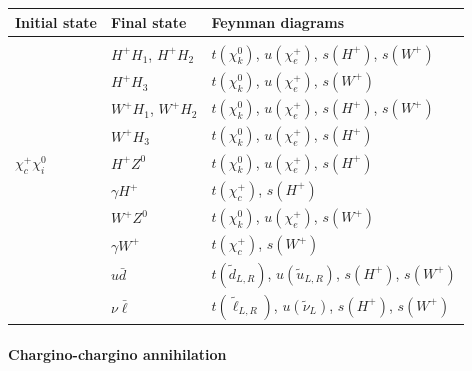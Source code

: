 \documentclass[a4paper,10pt,oneside]{book}
\newcommand{\tabspace}{\\[-2.5ex]}
\begin{document}
\begin{center}
\begin{tabular}{lll} \hline 
  Initial state & Final state & Feynman diagrams \\ \hline \tabspace
   & $H^+ H_1$, $H^+ H_2$ &
  $t(\chi_k^0)$, $u(\chi_e^+)$, $s(H^+)$, $s(W^+)$ \\
   & $H^+ H_3$ &
  $t(\chi_k^0)$, $u(\chi_e^+)$, $s(W^+)$ \\
   & $W^+ H_1$, $W^+ H_2$ &
  $t(\chi_k^0)$, $u(\chi_e^+)$, $s(H^+)$, $s(W^+)$ \\
   & $W^+ H_3$ &
  $t(\chi_k^0)$, $u(\chi_e^+)$, $s(H^+)$ \\
  $\chi_c^+ \chi_i^0$ & $H^+ Z^0$ &
  $t(\chi_k^0)$, $u(\chi_e^+)$, $s(H^+)$ \\
   & $\gamma H^+$ &
  $t(\chi_c^+)$, $s(H^+)$ \\
   & $W^+ Z^0$ &
  $t(\chi_k^0)$, $u(\chi_e^+)$, $s(W^+)$ \\
   & $\gamma W^+$ &
  $t(\chi_c^+)$, $s(W^+)$ \\
   & $u \bar{d}$ &
  $t(\tilde{d}_{L,R})$, $u(\tilde{u}_{L,R})$, $s(H^+)$, $s(W^+)$ \\
   & $\nu \bar{\ell}$ &
  $t(\tilde{\ell}_{L,R})$, $u(\tilde{\nu}_{L})$, $s(H^+)$, $s(W^+)$
  \\ \hline
\end{tabular}
\end{center}


\paragraph{Chargino-chargino annihilation}
\end{document}
